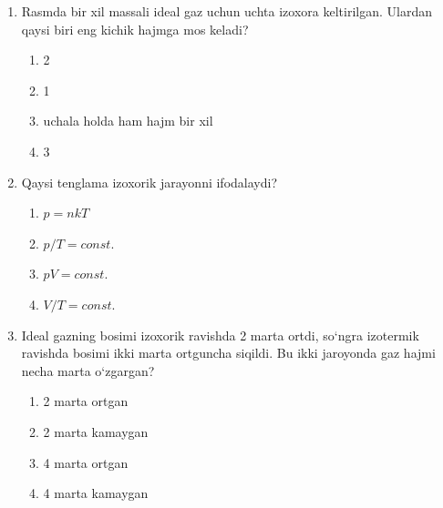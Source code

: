 \begin{enumerate}
\item Rasmda bir xil massali ideal gaz uchun uchta izoxora keltirilgan. Ulardan qaysi biri eng kichik hajmga mos keladi?


\begin{enumerate}[label=\Alph*)]
\item 2
\item 1
\item uchala holda ham hajm bir xil
\item 3
\end{enumerate}

\item Qaysi tenglama izoxorik jarayonni ifodalaydi?
\begin{enumerate}[label=\Alph*)]
\item $p = nkT$
\item $p/T = const.$
\item $pV = const.$
\item $V/T = const.$
\end{enumerate}

\item Ideal gazning bosimi izoxorik ravishda 2 marta ortdi, so`ngra izotermik ravishda bosimi ikki marta ortguncha siqildi. Bu ikki jaroyonda gaz hajmi necha marta o`zgargan?


\begin{enumerate}[label=\Alph*)]
\item 2 marta ortgan
\item 2 marta kamaygan
\item 4 marta ortgan
\item 4 marta kamaygan
\end{enumerate}


\end{enumerate}
